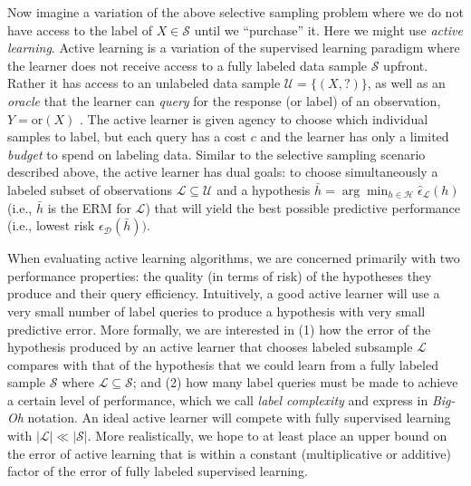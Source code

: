 Now imagine a variation of the above selective sampling problem where we do not have access to the label of $X \in \mathcal{S}$ until we ``purchase'' it. Here we might use \textit{active learning}. Active learning is a variation of the supervised learning paradigm where the learner does not receive access to a fully labeled data sample $\mathcal{S}$ upfront. Rather it has access to an unlabeled data sample $\mathcal{U} = \{(X, ?)\}$, as well as an \textit{oracle} that the learner can \textit{query} for the response (or label) of an observation, $Y = \mathrm{or}(X)$ \cite{dasgupta2011}. The active learner is given agency to choose which individual samples to label, but each query has a cost $c$ and the learner has only a limited \textit{budget} to spend on labeling data. Similar to the selective sampling scenario described above, the active learner has dual goals: to choose simultaneously a labeled subset of observations $\mathcal{L} \subseteq \mathcal{U}$ and a hypothesis $\bar{h} = \arg\min_{h \in \mathcal{H}} \hat{\epsilon}_{\mathcal{L}}(h)$ (i.e., $\bar{h}$ is the ERM for $\mathcal{L}$) that will yield the best possible predictive performance (i.e., lowest risk $\epsilon_{\mathcal{D}}(\bar{h}))$.

When evaluating active learning algorithms, we are concerned primarily with two performance properties: the quality (in terms of risk) of the hypotheses they produce and their query efficiency. Intuitively, a good active learner will use a very small number of label queries to produce a hypothesis with very small predictive error. More formally, we are interested in (1) how the error of the hypothesis produced by an active learner that chooses labeled subsample $\mathcal{L}$ compares with that of the hypothesis that we could learn from a fully labeled sample $\mathcal{S}$ where $\mathcal{L} \subseteq \mathcal{S}$; and (2) how many label queries must be made to achieve a certain level of performance, which we call \textit{label complexity} and express in \textit{Big-Oh} notation. An ideal active learner will compete with fully supervised learning with $|\mathcal{L}| \ll |\mathcal{S}|$. More realistically, we hope to at least place an upper bound on the error of active learning that is within a constant (multiplicative or additive) factor of the error of fully labeled supervised learning.

